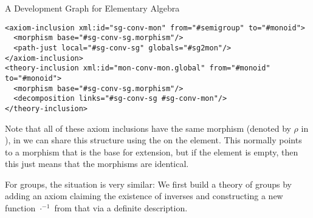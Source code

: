 \begin{omgroup}[id=dg-elal]{A Development Graph for Elementary Algebra}
\begin{lstlisting}[mathescape,index={axiom-inclusion,theory-inclusion,morphism,obligation}]
<axiom-inclusion xml:id="sg-conv-mon" from="#semigroup" to="#monoid">
  <morphism base="#sg-conv-sg.morphism"/>
  <path-just local="#sg-conv-sg" globals="#sg2mon"/>
</axiom-inclusion>
<theory-inclusion xml:id="mon-conv-mon.global" from="#monoid" to="#monoid">
  <morphism base="#sg-conv-sg.morphism"/>
  <decomposition links="#sg-conv-sg #sg-conv-mon"/>
</theory-inclusion>
\end{lstlisting}
Note that all of these axiom inclusions have the same morphism (denoted by $\rho$
in {}), in {\omdoc} we can share this structure using the
{} on the {} element. This normally
points to a morphism that is the base for extension, but if the
{} element is empty, then this just means that the morphisms are
identical. 

For groups, the situation is very similar: We first build a theory of groups by
adding an axiom claiming the existence of inverses and constructing a new function
$\cdot^{-1}$ from that via a definite description. 


\end{omgroup}
